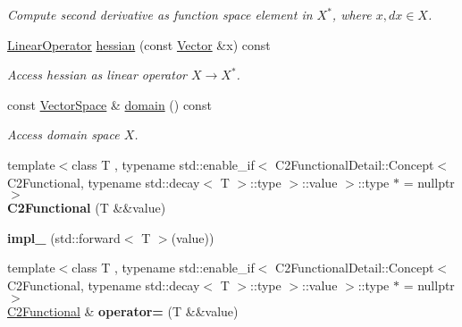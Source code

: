 \begin{DoxyCompactItemize}
\begin{DoxyCompactList}\small\item\em Compute second derivative as function space element in $X^*$, where $x,dx\in X$. \end{DoxyCompactList}\item 
\hypertarget{classSpacy_1_1C2Functional_a97eeeb376ed178ea7e2f109967f99c24}{\hyperlink{classSpacy_1_1LinearOperator}{Linear\-Operator} \hyperlink{classSpacy_1_1C2Functional_a97eeeb376ed178ea7e2f109967f99c24}{hessian} (const \hyperlink{classSpacy_1_1Vector}{Vector} \&x) const }\label{classSpacy_1_1C2Functional_a97eeeb376ed178ea7e2f109967f99c24}

\begin{DoxyCompactList}\small\item\em Access hessian as linear operator $ X \rightarrow X^* $. \end{DoxyCompactList}\item 
\hypertarget{classSpacy_1_1C2Functional_ac75246c876b8bf75cdd4f1264bdb49ae}{const \hyperlink{classSpacy_1_1VectorSpace}{Vector\-Space} \& \hyperlink{classSpacy_1_1C2Functional_ac75246c876b8bf75cdd4f1264bdb49ae}{domain} () const }\label{classSpacy_1_1C2Functional_ac75246c876b8bf75cdd4f1264bdb49ae}

\begin{DoxyCompactList}\small\item\em Access domain space $X$. \end{DoxyCompactList}\item 
\hypertarget{classSpacy_1_1C2Functional_ab6c458ef1a423c05f4996717f3772206}{{\footnotesize template$<$class T , typename std\-::enable\-\_\-if$<$ C2\-Functional\-Detail\-::\-Concept$<$ C2\-Functional, typename std\-::decay$<$ T $>$\-::type $>$\-::value $>$\-::type $\ast$  = nullptr$>$ }\\{\bfseries C2\-Functional} (T \&\&value)}\label{classSpacy_1_1C2Functional_ab6c458ef1a423c05f4996717f3772206}

\item 
\hypertarget{classSpacy_1_1C2Functional_a587d2b41ecaa5db9873b2ea8dca604c7}{{\bfseries impl\-\_\-} (std\-::forward$<$ T $>$(value))}\label{classSpacy_1_1C2Functional_a587d2b41ecaa5db9873b2ea8dca604c7}

\item 
\hypertarget{classSpacy_1_1C2Functional_ae5810a028be906128a2c982540fbbcae}{{\footnotesize template$<$class T , typename std\-::enable\-\_\-if$<$ C2\-Functional\-Detail\-::\-Concept$<$ C2\-Functional, typename std\-::decay$<$ T $>$\-::type $>$\-::value $>$\-::type $\ast$  = nullptr$>$ }\\\hyperlink{classSpacy_1_1C2Functional}{C2\-Functional} \& {\bfseries operator=} (T \&\&value)}\label{classSpacy_1_1C2Functional_ae5810a028be906128a2c982540fbbcae}


\end{DoxyCompactItemize}
